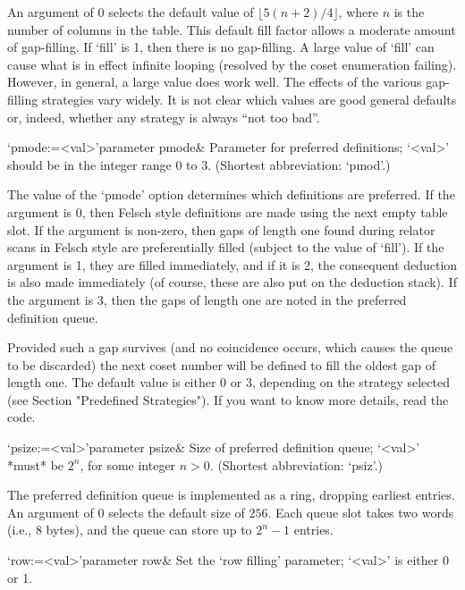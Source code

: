 An  argument of  0  selects  the default  value  of $\lfloor  5(n+2)/4
\rfloor$,  where $n$  is the  number of  columns in  the  table.  This
default  fill factor  allows  a moderate  amount  of gap-filling.   If
`fill' is  1, then there is  no gap-filling.  A large  value of `fill'
can cause  what is in effect  infinite looping (resolved  by the coset
enumeration failing).   However, in general,  a large value  does work
well.  The  effects of the various gap-filling  strategies vary widely.
It is  not clear  which values are  good general defaults  or, indeed,
whether any strategy is always ``not too bad''.

\>`pmode:=<val>'{parameter pmode}&
Parameter for preferred definitions;  `<val>' should be in the integer
range 0 to 3. (Shortest abbreviation: `pmod'.)

The  value of  the  `pmode' option  determines  which definitions  are
preferred.  If  the argument is  0, then Felsch style  definitions are
made using  the next empty table  slot.  If the  argument is non-zero,
then gaps of length one found during relator scans in Felsch style are
preferentially  filled  (subject to  the  value  of  `fill').  If  the
argument  is 1,  they are  filled  immediately, and  if it  is 2,  the
consequent deduction  is also made  immediately (of course,  these are
also put on the deduction stack).  If the argument is 3, then the gaps
of length one are noted in the preferred definition queue.

Provided such a gap survives  (and no coincidence occurs, which causes
the queue  to be discarded) the  next coset number will  be defined to
fill the oldest  gap of length one.  The default value  is either 0 or
3,  depending  on  the  strategy  selected  (see  Section  "Predefined
Strategies").  If you want to know more details, read the code.


\>`psize:=<val>'{parameter psize}&
Size of preferred definition queue; `<val>' *must*  be $2^n$, for some
integer $n>0$. (Shortest abbreviation: `psiz'.)

The  preferred definition  queue is  implemented as  a  ring, dropping
earliest entries. An argument of 0 selects  the default size of $256$.
Each  queue slot takes two words (i.e., 8 bytes),  and the  queue  can
store up to $2^n-1$ entries.



\>`row:=<val>'{parameter row}&
Set the \lq row filling' parameter; `<val>' is either 0 or 1.

